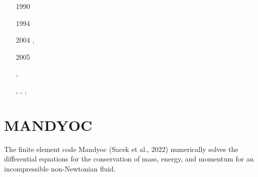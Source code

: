 \begin{small}
\begin{itemize}
\item[1990] \textcite{fetz90}
\item[1994] \textcite{zefe94}
\item[2004] \textcite{ayma04}, \textcite{femt04}
\item[2005] \textcite{zeaf05}
\item[\twothousandseven]      \textcite{afrf07}
\item[\twothousandeight]      \textcite{affr08}
\item[\twothousandnine]       \textcite{fuac09}
\item[\twothousandten]        \textcite{fufa10}, \textcite{jifv10}
\item[\twothousandeleven]     \textcite{paca11}
\item[\twothousandthirteen]   \textcite{affg13}
\item[\twothousandfifteen]    \textcite{fucn15}, \textcite{caft15}, \textcite{cafj15},
                              \textcite{peap15}
\item[\twothousandnineteen]   \textcite{jitf19}
\item[\twothousandtwenty]     \textcite{kufj20}
\item[\twothousandtwentyone]  \textcite{kufv21}
\item[\twothousandtwentytwo]  \textcite{zhjt22}
\item[\twothousandtwentythree]\textcite{tojn23}
\item[\twothousandtwentyfour] \textcite{zhjt24}
\end{itemize}
\end{small}



\section{MANDYOC}

The finite element code Mandyoc (Sacek et al., 2022) numerically solves 
the differential equations for
the conservation of mass, energy, and momentum for an incompressible non-Newtonian fluid.


